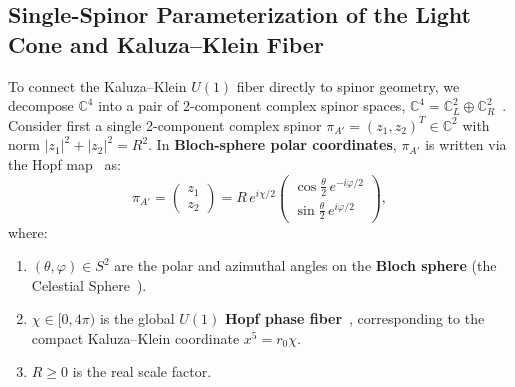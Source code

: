 \documentclass[11pt,a4paper]{article}
\begin{document}
\subsection{Single-Spinor Parameterization of the Light Cone and Kaluza--Klein Fiber}
To connect the Kaluza--Klein $U(1)$ fiber directly to spinor geometry, we decompose $\mathbb{C}^4$ into a pair of 2-component complex spinor spaces, $\mathbb{C}^4 = \mathbb{C}^2_L \oplus \mathbb{C}^2_R$~\cite{Penrose1967,PenroseRindler1984}. Consider first a single 2-component complex spinor $\pi_{A'} = (z_1, z_2)^T \in \mathbb{C}^2$ with norm $|z_1|^2 + |z_2|^2 = R^2$. In \textbf{Bloch-sphere polar coordinates}, $\pi_{A'}$ is written via the Hopf map~\cite{Hopf1931} as:
\begin{equation}
\pi_{A'} = \begin{pmatrix} z_1 \\ z_2 \end{pmatrix} = R\, e^{i \chi / 2} \begin{pmatrix} \cos\frac{\theta}{2}\, e^{-i\varphi/2} \\ \sin\frac{\theta}{2}\, e^{i\varphi/2} \end{pmatrix},
\end{equation}
where:
\begin{enumerate}
    \item $(\theta, \varphi) \in S^2$ are the polar and azimuthal angles on the \textbf{Bloch sphere} (the Celestial Sphere~\cite{PenroseRindler1984}).
    \item $\chi \in [0, 4\pi)$ is the global $U(1)$ \textbf{Hopf phase fiber}~\cite{Hopf1931}, corresponding to the compact Kaluza--Klein coordinate $x^5 = r_0 \chi$.
    \item $R \ge 0$ is the real scale factor.
\end{enumerate}
\end{document}
